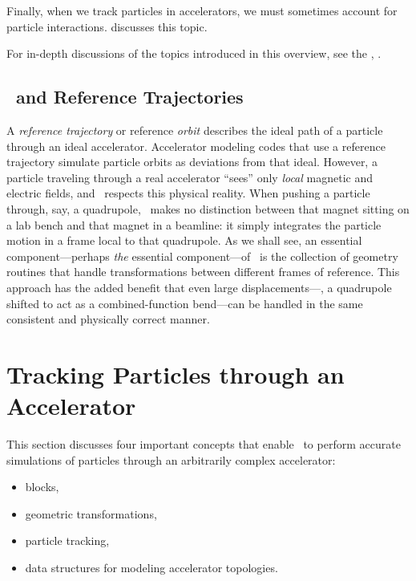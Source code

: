 Finally, when we track particles in accelerators, we must sometimes
account for particle interactions.
 discusses this topic.

For in-depth discussions of the topics introduced in this overview,
see the \Bibref, .


\subsection{\PTC\ and Reference Trajectories}

%
A \emph{reference trajectory} or reference \emph{orbit} describes the
ideal path of a particle through an ideal accelerator.  Accelerator
modeling codes that use a reference trajectory simulate particle orbits
as deviations from that ideal. However, a particle traveling through a
real accelerator ``sees'' only \emph{local} magnetic and electric fields,
and \PTC\ respects this physical reality. When pushing a particle through,
say, a quadrupole, \PTC\ makes no distinction between that magnet sitting
on a lab bench and that magnet in a beamline: it simply integrates the
particle motion in a frame local to that quadrupole. As we shall see,
an essential component---perhaps \emph{the} essential component---of
\PTC\ is the collection of geometry routines that handle transformations
between different frames of reference. This approach has the added benefit
that even large displacements---\eg, a quadrupole shifted to act as a
combined-function bend---can be handled in the same consistent and
physically correct manner.


\section{Tracking Particles through an Accelerator}
\label{sec:track.ptcl.accel}

%
This section discusses four important concepts that enable
\PTC\ to perform accurate simulations of particles through
an arbitrarily complex accelerator:
\begin{itemize}
  \item blocks,
  \item geometric transformations,
  \item particle tracking,
  \item data structures for modeling accelerator topologies.
\end{itemize}


